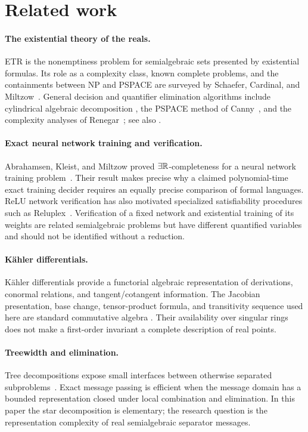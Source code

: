 \section{Related work}
\label{sec:related-work}

\paragraph{The existential theory of the reals.}
ETR is the nonemptiness problem for semialgebraic sets presented by existential
formulas.  Its role as a complexity class, known complete problems, and the
containments between NP and PSPACE are surveyed by Schaefer, Cardinal, and
Miltzow~\cite{SchaeferCardinalMiltzow2024}.  General decision and quantifier
elimination algorithms include cylindrical algebraic decomposition
\cite{Collins1975}, the PSPACE method of Canny~\cite{Canny1988}, and the
complexity analyses of Renegar~\cite{Renegar1992I}; see also
\cite{BasuPollackRoy2006}.

\paragraph{Exact neural network training and verification.}
Abrahamsen, Kleist, and Miltzow proved \(\exists\mathbb{R}\)-completeness for a neural
network training problem~\cite{AbrahamsenKleistMiltzow2021}.  Their result makes
precise why a claimed polynomial-time exact training decider requires an
equally precise comparison of formal languages.  ReLU network verification has
also motivated specialized satisfiability procedures such as
Reluplex~\cite{KatzEtAl2017}.  Verification of a fixed network and existential
training of its weights are related semialgebraic problems but have different
quantified variables and should not be identified without a reduction.

\paragraph{K\"ahler differentials.}
K\"ahler differentials provide a functorial algebraic representation of
derivations, conormal relations, and tangent/cotangent information.  The
Jacobian presentation, base change, tensor-product formula, and transitivity
sequence used here are standard commutative algebra
\cite{Eisenbud1995,StacksDifferentials}.  Their availability over singular
rings does not make a first-order invariant a complete description of real
points.

\paragraph{Treewidth and elimination.}
Tree decompositions expose small interfaces between otherwise separated
subproblems~\cite{Bodlaender1996}.  Exact message passing is efficient when the
message domain has a bounded representation closed under local combination and
elimination.  In this paper the star decomposition is elementary; the research
question is the representation complexity of real semialgebraic separator
messages.

